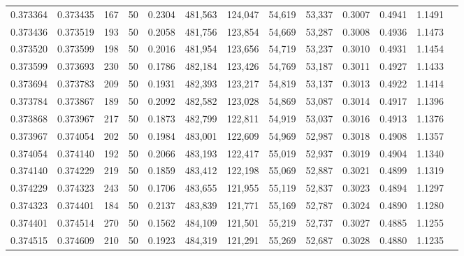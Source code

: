 \begin{tabular}{rrrrrrrrrrrrr}
0.373364 & 0.373435 &   167 &  50 &                                     0.2304 & 481,563 & 124,047 &  54,619 &  53,337 & 0.3007 & 0.4941 & 1.1491 \\
0.373436 & 0.373519 &   193 &  50 &                                     0.2058 & 481,756 & 123,854 &  54,669 &  53,287 & 0.3008 & 0.4936 & 1.1473 \\
0.373520 & 0.373599 &   198 &  50 &                                     0.2016 & 481,954 & 123,656 &  54,719 &  53,237 & 0.3010 & 0.4931 & 1.1454 \\
0.373599 & 0.373693 &   230 &  50 &                                     0.1786 & 482,184 & 123,426 &  54,769 &  53,187 & 0.3011 & 0.4927 & 1.1433 \\
0.373694 & 0.373783 &   209 &  50 &                                     0.1931 & 482,393 & 123,217 &  54,819 &  53,137 & 0.3013 & 0.4922 & 1.1414 \\
0.373784 & 0.373867 &   189 &  50 &                                     0.2092 & 482,582 & 123,028 &  54,869 &  53,087 & 0.3014 & 0.4917 & 1.1396 \\
0.373868 & 0.373967 &   217 &  50 &                                     0.1873 & 482,799 & 122,811 &  54,919 &  53,037 & 0.3016 & 0.4913 & 1.1376 \\
0.373967 & 0.374054 &   202 &  50 &                                     0.1984 & 483,001 & 122,609 &  54,969 &  52,987 & 0.3018 & 0.4908 & 1.1357 \\
0.374054 & 0.374140 &   192 &  50 &                                     0.2066 & 483,193 & 122,417 &  55,019 &  52,937 & 0.3019 & 0.4904 & 1.1340 \\
0.374140 & 0.374229 &   219 &  50 &                                     0.1859 & 483,412 & 122,198 &  55,069 &  52,887 & 0.3021 & 0.4899 & 1.1319 \\
0.374229 & 0.374323 &   243 &  50 &                                     0.1706 & 483,655 & 121,955 &  55,119 &  52,837 & 0.3023 & 0.4894 & 1.1297 \\
0.374323 & 0.374401 &   184 &  50 &                                     0.2137 & 483,839 & 121,771 &  55,169 &  52,787 & 0.3024 & 0.4890 & 1.1280 \\
0.374401 & 0.374514 &   270 &  50 &                                     0.1562 & 484,109 & 121,501 &  55,219 &  52,737 & 0.3027 & 0.4885 & 1.1255 \\
0.374515 & 0.374609 &   210 &  50 &                                     0.1923 & 484,319 & 121,291 &  55,269 &  52,687 & 0.3028 & 0.4880 & 1.1235 \\

\end{tabular}
